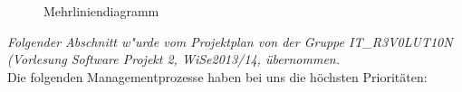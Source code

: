 \documentclass[fontsize=12pt,paper=a4,twoside]{scrartcl}
\begin{document}
\newpage
\begin{figure}[h!]
\caption{Mehrliniendiagramm}
\label{Bild:image}
\end{figure}

\textit{Folgender Abschnitt w"urde vom Projektplan von der Gruppe IT\_R3V0LUT10N (Vorlesung Software Projekt 2, WiSe2013/14, übernommen.}\\
Die folgenden Managementprozesse haben bei uns die höchsten Prioritäten:
\bigskip \\
\end{document}
